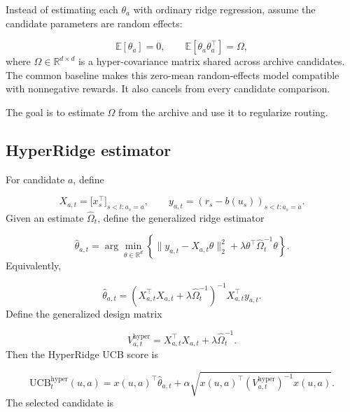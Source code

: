 \documentclass{article} %
\begin{document}
Instead of estimating each $\theta_a$ with ordinary ridge regression, assume
the candidate parameters are random effects:

\begin{equation}
\mathbb{E}[\theta_a]=0,\qquad
\mathbb{E}[\theta_a\theta_a^\top]=\Omega,
\end{equation}
where $\Omega \in \mathbb{R}^{d \times d}$ is a hyper-covariance matrix shared
across archive candidates. The common baseline makes this zero-mean random-effects model compatible with nonnegative rewards. It also cancels from every candidate comparison.

The goal is to estimate $\Omega$ from the archive and use it to regularize
routing.

\subsection{HyperRidge estimator}

For candidate $a$, define

\begin{equation}
X_{a,t} = \bigl[ x_s^\top \bigr]_{s < t : a_s = a}, \qquad
y_{a,t} = (r_s-b(u_s))_{s < t : a_s = a}.
\end{equation}
Given an estimate $\widehat{\Omega}_t$, define the generalized ridge estimator

\begin{equation}
\widehat{\theta}_{a,t}
= \arg\min_{\theta \in \mathbb{R}^d}
\left\{ \| y_{a,t} - X_{a,t}\theta \|_2^2
      + \lambda \theta^\top \widehat{\Omega}_t^{-1} \theta \right\}.
\end{equation}
Equivalently,

\begin{equation}
\label{eq:hyper-theta-hat}
\widehat{\theta}_{a,t}
= \left( X_{a,t}^\top X_{a,t} + \lambda \widehat{\Omega}_t^{-1} \right)^{-1}
  X_{a,t}^\top y_{a,t}.
\end{equation}
Define the generalized design matrix

\begin{equation}
\label{eq:hyper-design}
V_{a,t}^{\mathrm{hyper}} = X_{a,t}^\top X_{a,t} + \lambda \widehat{\Omega}_t^{-1}.
\end{equation}
Then the HyperRidge UCB score is

\begin{equation}
\label{eq:hyper-ucb}
\mathrm{UCB}_t^{\mathrm{hyper}}(u, a)
= x(u, a)^\top \widehat{\theta}_{a,t}
+ \alpha \sqrt{ x(u, a)^\top \left( V_{a,t}^{\mathrm{hyper}} \right)^{-1} x(u, a) }.
\end{equation}
The selected candidate is
\end{document}
